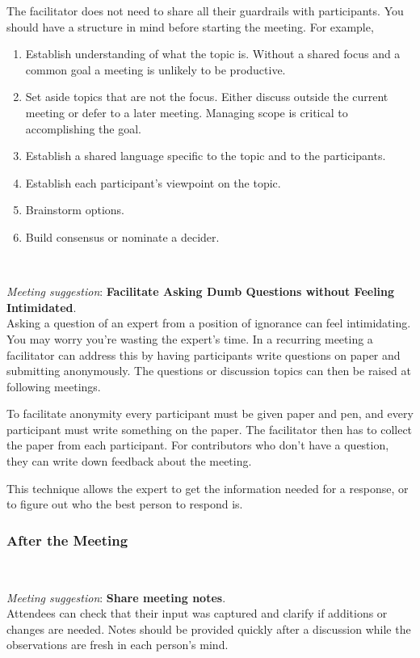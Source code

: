 The facilitator does not need to share all their guardrails with participants. You should have a structure in mind before starting the meeting. For example,
\begin{enumerate}
    \item Establish understanding of what the topic is. Without a shared focus and a common goal a meeting is unlikely to be productive. 
    \item Set aside topics that are not the focus. Either discuss outside the current meeting or defer to a later meeting. Managing scope is critical to accomplishing the goal. 
    \item Establish a shared language specific to the topic and to the participants.
    \item Establish each participant's viewpoint on the topic.
    \item Brainstorm options.
    \item Build consensus or nominate a decider.
\end{enumerate}


\ \\
\begin{samepage}
\textit{Meeting suggestion}: \textbf{Facilitate Asking Dumb Questions without Feeling Intimidated}.\\
\nopagebreak %
Asking a question of an expert from a position of ignorance can feel intimidating. You may worry you're wasting the expert's time. In a recurring meeting a facilitator can address this by having participants write questions on paper and submitting anonymously. The questions or discussion topics can then be raised at following meetings. 
\end{samepage}

To facilitate anonymity every participant must be given paper and pen, and every participant must write something on the paper. The facilitator then has to collect the paper from each participant. For contributors who don't have a question, they can write down feedback about the meeting. 

This technique allows the expert to get the information needed for a response, or to figure out who the best person to respond is. 

\subsubsection*{After the Meeting}

\ \\
\begin{samepage}
\textit{Meeting suggestion}: \textbf{Share meeting notes}.\\
Attendees can check that their input was captured and clarify if additions or changes are needed. Notes should be provided quickly after a discussion while the observations are fresh in each person's mind.
\end{samepage}


